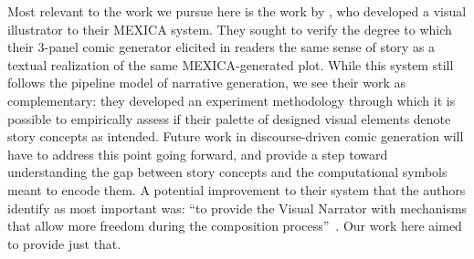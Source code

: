 Most relevant to the work we pursue here is the work by
, who developed a visual illustrator to their
MEXICA system. They sought to verify the degree to which their 3-panel comic 
generator elicited in readers the same sense of story as a textual realization 
of the same MEXICA-generated plot. While this system still follows the pipeline
model of narrative generation, we see their work as complementary: they developed 
an experiment methodology through which it is possible to empirically assess if
their palette of designed visual elements denote story concepts as intended. 
Future work in discourse-driven comic generation will have to address this
point going forward, and \citeauthor{perezyperez2012illustrating} provide a step
toward understanding the gap between story concepts and the computational symbols
meant to encode them. A potential improvement to their system that the authors 
identify as most important was: ``to provide the Visual Narrator with mechanisms
that allow more freedom during the composition 
process''~\cite{perezyperez2012illustrating}. Our work here aimed to provide just 
that.
